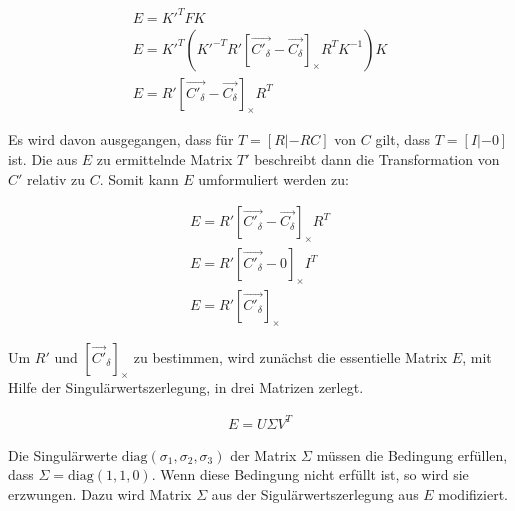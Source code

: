\begin{gather}
	 E= K'^T F K\\
    E= K'^T (K'^{-T}R' \left[ \vec{C'_\delta}-\vec{C_\delta}\right]_\times R^TK^{-1}) K\\
	E = R' \left[ \vec{C'_\delta}-\vec{C_\delta}\right]_\times R^T	
\end{gather}

%


Es wird davon ausgegangen, dass für $T = [R|-RC]$ von $C$ gilt, dass $T = [I|-0]$ ist. Die aus $E$ zu ermittelnde Matrix $T'$ beschreibt dann die Transformation von $C'$ relativ zu $C$\cite{HZ,Ferid}. Somit kann $E$ umformuliert werden zu:

\begin{gather}
	E = R'[\vec{C'_\delta} - \vec{C_\delta}]_\times R^T\\
	E = R'[\vec{C'_\delta} - 0]_\times I^T\\
	E = R'[\vec{C'_\delta}]_\times
\end{gather}


Um $R'$ und $[\vec{C'}_\delta]_\times$ zu bestimmen, wird zunächst die essentielle Matrix \ensuremath{E}, mit Hilfe der Singulärwertszerlegung, in drei Matrizen zerlegt. 

\begin{gather}
E = U\Sigma V^T
\end{gather}


Die Singulärwerte $\text{diag}(\sigma_1,\sigma_2,\sigma_3)$ der Matrix $\Sigma$ müssen die Bedingung erfüllen, dass $\Sigma = \text{diag}(1,1,0)$\cite{HZ,Ferid}. Wenn diese Bedingung nicht erfüllt ist, so wird sie erzwungen. Dazu wird Matrix $\Sigma$ aus der Sigulärwertszerlegung aus $E$ modifiziert\cite{HZ,Ferid}. 

